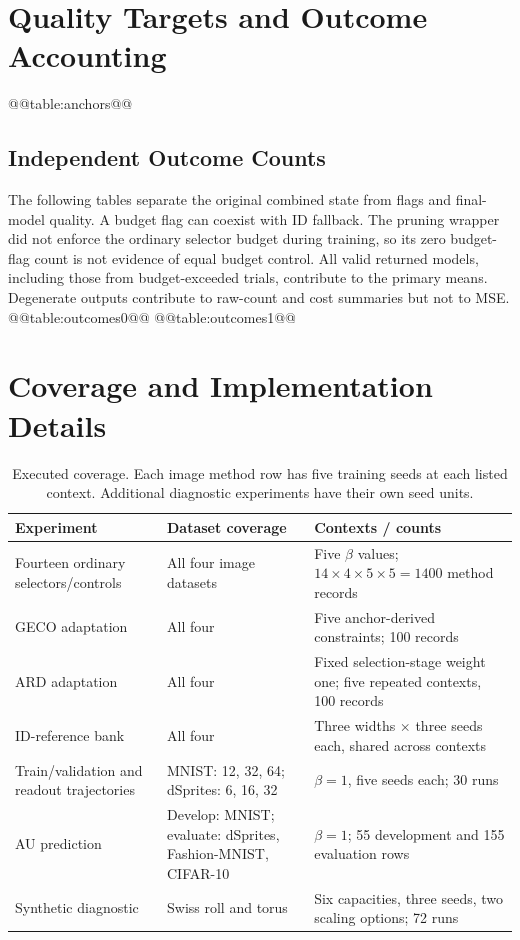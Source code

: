 \appendixstart
\appendix
\section{Quality Targets and Outcome Accounting}\label{app:targets}
@@table:anchors@@

\subsection{Independent Outcome Counts}\label{app:outcomes}
The following tables separate the original combined state from flags and
final-model quality. A budget flag can coexist with ID fallback. The
pruning wrapper did not enforce the ordinary selector budget during
training, so its zero budget-flag count is not evidence of equal budget
control. All valid returned models, including those from budget-exceeded
trials, contribute to the primary means. Degenerate outputs contribute
to raw-count and cost summaries but not to MSE.
@@table:outcomes0@@
@@table:outcomes1@@

\section{Coverage and Implementation Details}\label{app:coverage}
\begin{table}[H]
\caption{Executed coverage. Each image method row has five training
seeds at each listed context. Additional diagnostic experiments have
their own seed units.}
\label{tab:coverage}\small
\begin{tabularx}{\textwidth}{lXX}\toprule
Experiment & Dataset coverage & Contexts / counts \\\midrule
Fourteen ordinary selectors/controls & All four image datasets & Five $\beta$ values; $14\times4\times5\times5=1400$ method records \\
GECO adaptation & All four & Five anchor-derived constraints; 100 records \\
ARD adaptation & All four & Fixed selection-stage weight one; five repeated contexts, 100 records \\
ID-reference bank & All four & Three widths $\times$ three seeds each, shared across contexts \\
Train/validation and readout trajectories & MNIST: 12, 32, 64; dSprites: 6, 16, 32 & $\beta=1$, five seeds each; 30 runs \\
AU prediction & Develop: MNIST; evaluate: dSprites, Fashion-MNIST, CIFAR-10 & $\beta=1$; 55 development and 155 evaluation rows \\
Synthetic diagnostic & Swiss roll and torus & Six capacities, three seeds, two scaling options; 72 runs \\
\bottomrule\end{tabularx}
\end{table}

